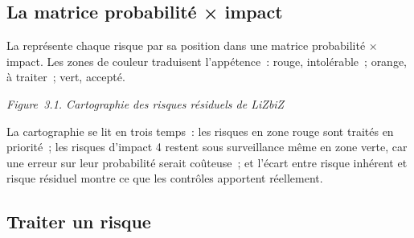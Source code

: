 \subsection{La matrice probabilité × impact}

La 
représente chaque risque par sa position dans une matrice probabilité ×
impact. Les zones de couleur traduisent l'appétence~: rouge, intolérable~;
orange, à traiter~; vert, accepté.

\noindent\begin{minipage}{\linewidth}
\begin{center}
\end{center}
\vspace{-0.4em}
\begin{center}{\small\itshape Figure~3.1. Cartographie des risques
résiduels de LiZbiZ}\end{center}
\end{minipage}

\medskip

La cartographie se lit en trois temps~: les risques en zone rouge sont
traités en priorité~; les risques d'impact 4 restent sous surveillance même
en zone verte, car une erreur sur leur probabilité serait coûteuse~; et
l'écart entre risque inhérent et risque résiduel montre ce que les
contrôles apportent réellement.

\subsection{Traiter un risque}

